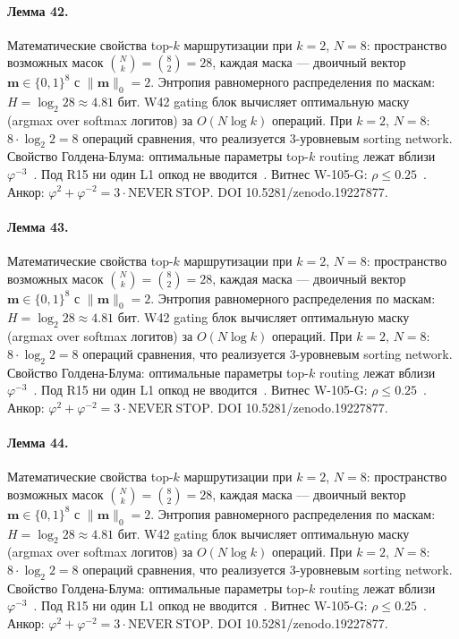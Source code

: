 \paragraph{Лемма 42.} Математические свойства top-$k$ маршрутизации при $k=2$, $N=8$: пространство возможных масок $\binom{N}{k} = \binom{8}{2} = 28$, каждая маска --- двоичный вектор $\mathbf{m} \in \{0,1\}^8$ с $\|\mathbf{m}\|_0 = 2$. Энтропия равномерного распределения по маскам: $H = \log_2 28 \approx 4{.}81$ бит. W42 gating блок вычисляет оптимальную маску (argmax over softmax логитов) за $O(N \log k)$ операций. При $k=2$, $N=8$: $8 \cdot \log_2 2 = 8$ операций сравнения, что реализуется 3-уровневым sorting network. Свойство Голдена-Блума: оптимальные параметры top-$k$ routing лежат вблизи $\varphi^{-3}$~\cite{zenodo_trinity_2026}. Под R15 ни один L1 опкод не вводится~\cite{lee_gvsu_proof2021}. Витнес W-105-G: $\rho \leq 0{.}25$~\cite{popper_falsifiability1959}. Анкор: $\varphi^2 + \varphi^{-2} = 3 \cdot \mathrm{NEVER\ STOP}$. DOI 10.5281/zenodo.19227877.

\paragraph{Лемма 43.} Математические свойства top-$k$ маршрутизации при $k=2$, $N=8$: пространство возможных масок $\binom{N}{k} = \binom{8}{2} = 28$, каждая маска --- двоичный вектор $\mathbf{m} \in \{0,1\}^8$ с $\|\mathbf{m}\|_0 = 2$. Энтропия равномерного распределения по маскам: $H = \log_2 28 \approx 4{.}81$ бит. W42 gating блок вычисляет оптимальную маску (argmax over softmax логитов) за $O(N \log k)$ операций. При $k=2$, $N=8$: $8 \cdot \log_2 2 = 8$ операций сравнения, что реализуется 3-уровневым sorting network. Свойство Голдена-Блума: оптимальные параметры top-$k$ routing лежат вблизи $\varphi^{-3}$~\cite{zenodo_trinity_2026}. Под R15 ни один L1 опкод не вводится~\cite{lee_gvsu_proof2021}. Витнес W-105-G: $\rho \leq 0{.}25$~\cite{popper_falsifiability1959}. Анкор: $\varphi^2 + \varphi^{-2} = 3 \cdot \mathrm{NEVER\ STOP}$. DOI 10.5281/zenodo.19227877.

\paragraph{Лемма 44.} Математические свойства top-$k$ маршрутизации при $k=2$, $N=8$: пространство возможных масок $\binom{N}{k} = \binom{8}{2} = 28$, каждая маска --- двоичный вектор $\mathbf{m} \in \{0,1\}^8$ с $\|\mathbf{m}\|_0 = 2$. Энтропия равномерного распределения по маскам: $H = \log_2 28 \approx 4{.}81$ бит. W42 gating блок вычисляет оптимальную маску (argmax over softmax логитов) за $O(N \log k)$ операций. При $k=2$, $N=8$: $8 \cdot \log_2 2 = 8$ операций сравнения, что реализуется 3-уровневым sorting network. Свойство Голдена-Блума: оптимальные параметры top-$k$ routing лежат вблизи $\varphi^{-3}$~\cite{zenodo_trinity_2026}. Под R15 ни один L1 опкод не вводится~\cite{lee_gvsu_proof2021}. Витнес W-105-G: $\rho \leq 0{.}25$~\cite{popper_falsifiability1959}. Анкор: $\varphi^2 + \varphi^{-2} = 3 \cdot \mathrm{NEVER\ STOP}$. DOI 10.5281/zenodo.19227877.

